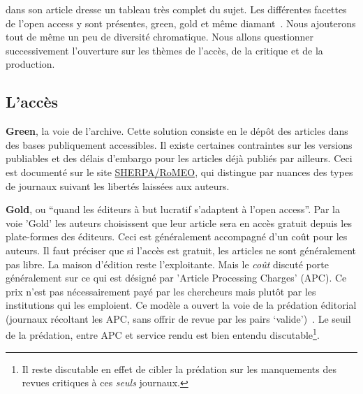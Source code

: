 \citeauthor{moody_open_2016} dans son article  dresse un tableau très complet du sujet.
Les différentes facettes de l'open access y sont présentes, green, gold et même diamant~\cite{moody_open_2016}.
Nous ajouterons tout de m{\^e}me un peu de diversité chromatique.
Nous allons questionner successivement l'ouverture sur les thèmes de l'accès, de la critique et de la production.

%

\subsection{L'accès}
\textbf{Green}, la voie de l'archive.
Cette solution consiste en le dépôt des articles dans des bases publiquement accessibles.
Il existe certaines contraintes sur les versions publiables et des délais d'embargo pour les articles déjà publiés par ailleurs.
Ceci est documenté sur le site \href{http://www.sherpa.ac.uk/romeo/search.php}{SHERPA/RoMEO}, qui distingue par nuances des types de journaux suivant les libertés laissées aux auteurs.

\textbf{Gold}, ou ``quand les éditeurs à but lucratif s'adaptent à l'open access''.
Par la voie 'Gold' les auteurs choisissent que leur article sera en accès gratuit depuis les plate-formes des éditeurs.
Ceci est généralement accompagné d'un coût pour les auteurs.
Il faut préciser que si l'accès est gratuit, les articles ne sont généralement pas libre.
La maison d'édition reste l'exploitante.
Mais le \textit{coût} discuté porte généralement sur ce qui est désigné par 'Article Processing Charges' (APC).
Ce prix n'est pas nécessairement payé par les chercheurs mais plutôt par les institutions qui les emploient.
Ce modèle a ouvert la voie de la prédation éditorial (journaux récoltant les APC, sans offrir de revue par les pairs `valide')~\cite{shen_predatory_2015}.
Le seuil de la prédation, entre APC et service rendu est bien entendu discutable\footnote{
Il reste discutable en effet de cibler la prédation sur les manquements des revues critiques à ces \textit{seuls} journaux.}.

